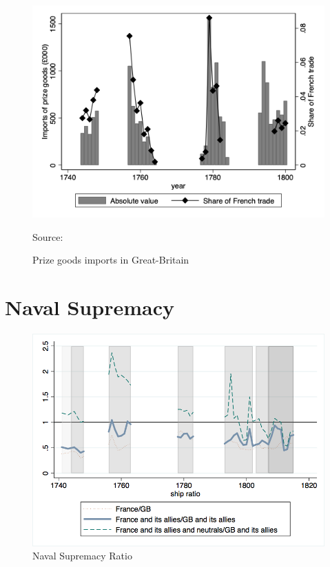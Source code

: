 \documentclass[12pt,a4paper,notitlepage,english]{article}
\newcommand{\source}[1]{\caption*{\footnotesize Source: {#1}} }
\begin{document}
\begin{appendix}
\begin{center}
	\begin{figure}[h!]
		\caption{Prize goods imports in Great-Britain}
		\label{Prize goods imports}
		\centering
		\includegraphics[scale=0.7]{Prizes_imports.png}
		\source{\cite{Ashton1960}}
	\end{figure}
\end{center}

\section{Naval Supremacy}
\begin{center}
\begin{figure}[h!]
\caption{Naval Supremacy Ratio}
\label{naval_supremacy_ratios}
\centering
\includegraphics[scale=.51]{naval_supremacy_ratios.png}
\end{figure}
\end{center}


\end{appendix}
\end{document}
